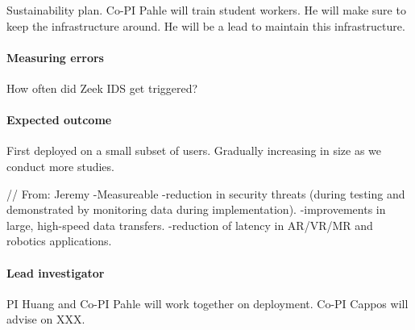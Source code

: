 Sustainability plan. Co-PI Pahle will train student workers. He will make sure to keep the infrastructure around. He will be a lead to maintain this infrastructure.




\paragraph{Measuring errors} How often did Zeek IDS get triggered?


\paragraph{Expected outcome} First deployed on a small subset of users. Gradually increasing in size as we conduct more studies.

// From: Jeremy
	-Measureable
-reduction in security threats (during testing and demonstrated by monitoring
data during implementation).
	-improvements in large, high-speed data transfers.
	-reduction of latency in AR/VR/MR and robotics applications.


\paragraph{Lead investigator} PI Huang and Co-PI Pahle will work together on deployment. Co-PI Cappos will advise on XXX.
